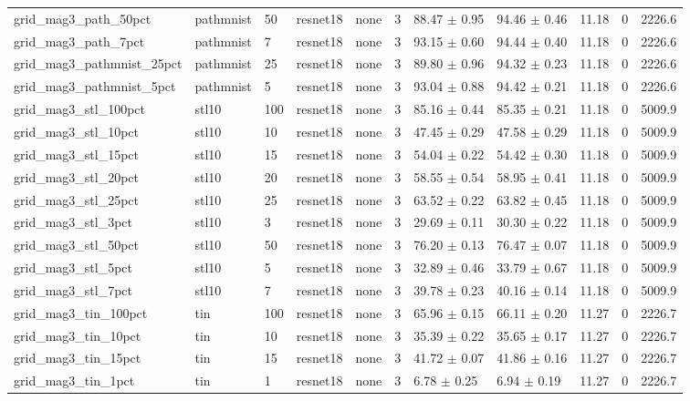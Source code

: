 \begin{tabular}{lllllllllll}
grid_mag3_path_50pct & pathmnist & 50 & resnet18 & none & 3 & 88.47 $\pm$ 0.95 & 94.46 $\pm$ 0.46 & 11.18 & 0 & 2226.6 \\
grid_mag3_path_7pct & pathmnist & 7 & resnet18 & none & 3 & 93.15 $\pm$ 0.60 & 94.44 $\pm$ 0.40 & 11.18 & 0 & 2226.6 \\
grid_mag3_pathmnist_25pct & pathmnist & 25 & resnet18 & none & 3 & 89.80 $\pm$ 0.96 & 94.32 $\pm$ 0.23 & 11.18 & 0 & 2226.6 \\
grid_mag3_pathmnist_5pct & pathmnist & 5 & resnet18 & none & 3 & 93.04 $\pm$ 0.88 & 94.42 $\pm$ 0.21 & 11.18 & 0 & 2226.6 \\
grid_mag3_stl_100pct & stl10 & 100 & resnet18 & none & 3 & 85.16 $\pm$ 0.44 & 85.35 $\pm$ 0.21 & 11.18 & 0 & 5009.9 \\
grid_mag3_stl_10pct & stl10 & 10 & resnet18 & none & 3 & 47.45 $\pm$ 0.29 & 47.58 $\pm$ 0.29 & 11.18 & 0 & 5009.9 \\
grid_mag3_stl_15pct & stl10 & 15 & resnet18 & none & 3 & 54.04 $\pm$ 0.22 & 54.42 $\pm$ 0.30 & 11.18 & 0 & 5009.9 \\
grid_mag3_stl_20pct & stl10 & 20 & resnet18 & none & 3 & 58.55 $\pm$ 0.54 & 58.95 $\pm$ 0.41 & 11.18 & 0 & 5009.9 \\
grid_mag3_stl_25pct & stl10 & 25 & resnet18 & none & 3 & 63.52 $\pm$ 0.22 & 63.82 $\pm$ 0.45 & 11.18 & 0 & 5009.9 \\
grid_mag3_stl_3pct & stl10 & 3 & resnet18 & none & 3 & 29.69 $\pm$ 0.11 & 30.30 $\pm$ 0.22 & 11.18 & 0 & 5009.9 \\
grid_mag3_stl_50pct & stl10 & 50 & resnet18 & none & 3 & 76.20 $\pm$ 0.13 & 76.47 $\pm$ 0.07 & 11.18 & 0 & 5009.9 \\
grid_mag3_stl_5pct & stl10 & 5 & resnet18 & none & 3 & 32.89 $\pm$ 0.46 & 33.79 $\pm$ 0.67 & 11.18 & 0 & 5009.9 \\
grid_mag3_stl_7pct & stl10 & 7 & resnet18 & none & 3 & 39.78 $\pm$ 0.23 & 40.16 $\pm$ 0.14 & 11.18 & 0 & 5009.9 \\
grid_mag3_tin_100pct & tin & 100 & resnet18 & none & 3 & 65.96 $\pm$ 0.15 & 66.11 $\pm$ 0.20 & 11.27 & 0 & 2226.7 \\
grid_mag3_tin_10pct & tin & 10 & resnet18 & none & 3 & 35.39 $\pm$ 0.22 & 35.65 $\pm$ 0.17 & 11.27 & 0 & 2226.7 \\
grid_mag3_tin_15pct & tin & 15 & resnet18 & none & 3 & 41.72 $\pm$ 0.07 & 41.86 $\pm$ 0.16 & 11.27 & 0 & 2226.7 \\
grid_mag3_tin_1pct & tin & 1 & resnet18 & none & 3 & 6.78 $\pm$ 0.25 & 6.94 $\pm$ 0.19 & 11.27 & 0 & 2226.7 \\

\end{tabular}
